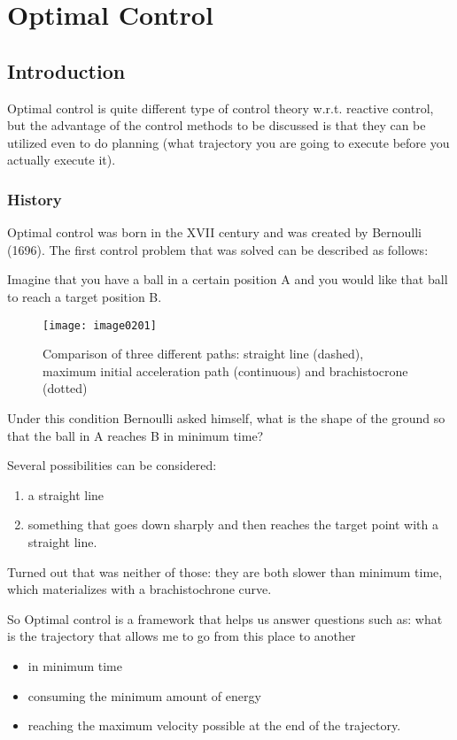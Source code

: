 \chapter{Optimal Control}

\section{Introduction}

Optimal control is quite different type of control theory w.r.t. reactive control, but the advantage of the control methods to be discussed is that they can be utilized even to do planning (what trajectory you are going to execute before you actually execute it).

\subsection{History}

Optimal control was born in the XVII century and was created by Bernoulli (1696). The first control problem that was solved can be described as follows:

Imagine that you have a ball in a certain position A and you would like that ball to reach a target position B.
\begin{figure}[!h]
\centering
\texttt{[image: image0201]}
\caption{Comparison of three different paths: straight line (dashed), maximum initial acceleration path (continuous) and brachistocrone (dotted)}
\end{figure}
Under this condition Bernoulli asked himself, what is the shape of the ground so that the ball in A reaches B in minimum time?

Several possibilities can be considered:
\begin{enumerate} 
\item a straight line
\item something that goes down sharply and then reaches the target point with a straight line.
\end{enumerate}

Turned out that was neither of those: they are both slower than minimum time, which materializes with a brachistochrone curve.

So Optimal control is a framework that helps us answer questions such as: what is the trajectory that allows me to go from this place to another
\begin{itemize} 
\item in minimum time
\item consuming the minimum amount of energy
\item  reaching the maximum velocity possible at the end of the trajectory.
\end{itemize}

